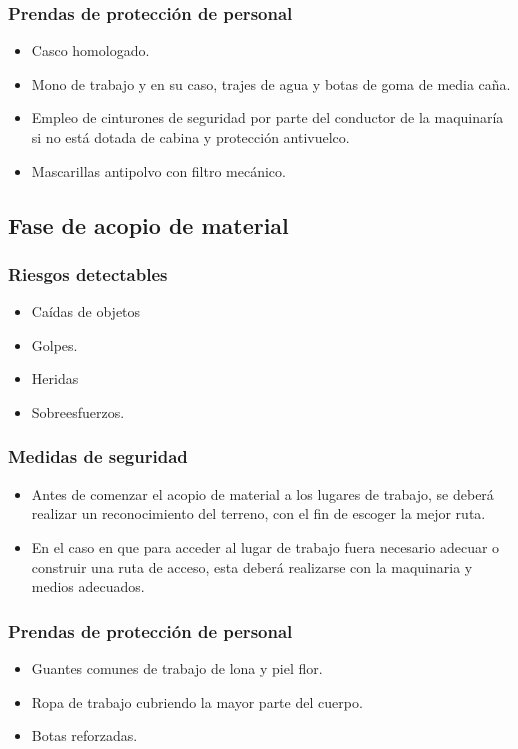 \subsubsection{Prendas de protección de personal}
\label{subsubsec:sysActuaciones-EPI}
\begin{itemize}
    \item Casco homologado.
    \item Mono de trabajo y en su caso, trajes de agua y botas de goma de media caña.
    \item Empleo de cinturones de seguridad por parte del conductor de la maquinaría si no está dotada de cabina y protección antivuelco.
    \item Mascarillas antipolvo con filtro mecánico.

\end{itemize}
\subsection{Fase de acopio de material}
\label{subsec:sys-riesgosMaterial}
\subsubsection{Riesgos detectables}
\label{subsubsec:sysMaterial-RD}
\begin{itemize}
    \item Caídas de objetos
    \item Golpes.
    \item Heridas
    \item Sobreesfuerzos.
\end{itemize}
\subsubsection{Medidas de seguridad}
\label{subsubsec:sysMaterial-MS}
\begin{itemize}
    \item Antes de comenzar el acopio de material a los lugares de trabajo, se deberá realizar un reconocimiento del terreno, con el fin de escoger la mejor ruta.
    \item En el caso en que para acceder al lugar de trabajo fuera necesario adecuar o construir una ruta de acceso, esta deberá realizarse con la maquinaria y medios adecuados.
\end{itemize}
\subsubsection{Prendas de protección de personal}
\label{subsubsec:sysMaterial-EPI}
\begin{itemize}
    \item Guantes comunes de trabajo de lona y piel flor.
    \item Ropa de trabajo cubriendo la mayor parte del cuerpo.
    \item Botas reforzadas.
\end{itemize}
